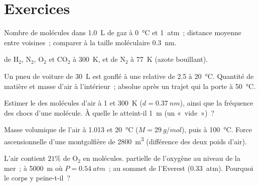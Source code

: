 \section{Exercices}

\begin{exercise}[$\star$]\label{exo:b1:kinetic-theory:1}
Nombre de molécules dans \qty{1.0}{L} de gaz à \qty{0}{\degreeCelsius} et
\qty{1}{atm}~; distance moyenne entre voisines~; comparer à la taille
moléculaire \qty{0.3}{nm}.
\end{exercise}

\begin{exercise}[$\star$]\label{exo:b1:kinetic-theory:2}
 de H$_2$, N$_2$, O$_2$ et CO$_2$ à
\qty{300}{K}, et de N$_2$ à \qty{77}{K} (azote bouillant).
\end{exercise}

\begin{exercise}[$\star$]\label{exo:b1:kinetic-theory:3}
Un pneu de voiture de \qty{30}{L} est gonflé à une  relative de
\qty{2.5}{} à \qty{20}{\degreeCelsius}. Quantité de matière et masse
d'air à l'intérieur~;  absolue après un trajet qui la porte à
\qty{50}{\degreeCelsius}.
\end{exercise}

\begin{exercise}[$\star$]\label{exo:b1:kinetic-theory:4}
Estimer le  des molécules d'air à \qty{1}{} et
\qty{300}{K} ($d = \qty{0.37}{nm}$), ainsi que la fréquence des chocs
d'une molécule. À quelle  le  atteint-il
\qty{1}{m} (un «~vide~»)~?
\end{exercise}

\begin{exercise}[$\star\star$]\label{exo:b1:kinetic-theory:5}
Masse volumique de l'air à \qty{1.013}{} et \qty{20}{\degreeCelsius}
($M = \qty{29}{g/mol}$), puis à \qty{100}{\degreeCelsius}. Force
ascensionnelle d'une montgolfière de \qty{2800}{m^3} (différence des
deux poids d'air).
\end{exercise}

\begin{exercise}[$\star\star$]\label{exo:b1:kinetic-theory:6}
L'air contient $21\%$ de O$_2$ en molécules.  partielle de
l'oxygène au niveau de la mer~; à \qty{5000}{m} où $P = \qty{0.54}{atm}$~;
au sommet de l'Everest (\qty{0.33}{atm}). Pourquoi le corps y peine-t-il~?
\end{exercise}

